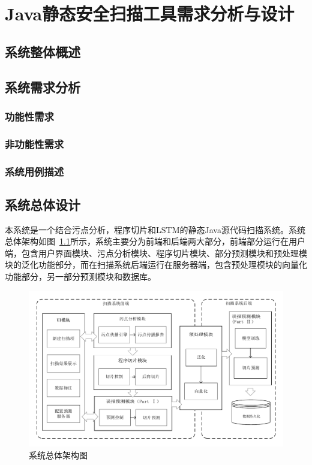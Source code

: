 \chapter{Java静态安全扫描工具需求分析与设计}
\section{系统整体概述}

\section{系统需求分析}
\subsection{功能性需求}
\subsection{非功能性需求}
\subsection{系统用例描述}
\section{系统总体设计}
本系统是一个结合污点分析，程序切片和LSTM的静态Java源代码扫描系统。系统总体架构如图~\ref{overview}所示，系统主要分为前端和后端两大部分，前端部分运行在用户端，包含用户界面模块、污点分析模块、程序切片模块、部分预测模块和预处理模块的泛化功能部分，而在扫描系统后端运行在服务器端，包含预处理模块的向量化功能部分，另一部分预测模块和数据库。


\begin{figure}[htb]
	\centering
	\includegraphics[width=5in]{FIGs/system-architecture.pdf}
	\caption{系统总体架构图}\label{overview}
\end{figure}

